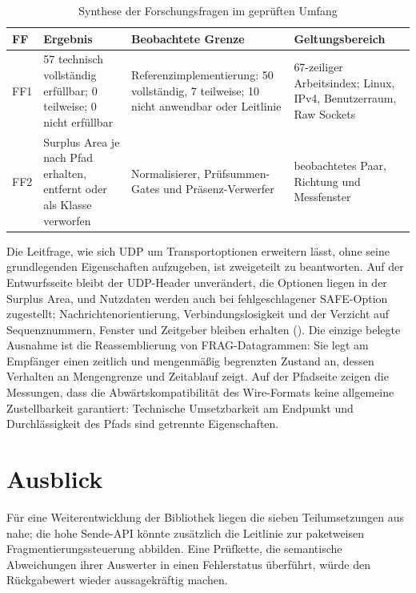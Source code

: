 \begin{table}[htbp]
    \centering
    \caption{Synthese der Forschungsfragen im geprüften Umfang}
    \label{tab:fazit-synthese}
    \small
    \begin{tabularx}{\textwidth}{@{}L{1.0cm}L{4.1cm}YL{4.2cm}@{}}
        \toprule
        \textbf{FF} & \textbf{Ergebnis} & \textbf{Beobachtete Grenze} & \textbf{Geltungsbereich} \\
        \midrule
        FF1 & 57 technisch vollständig erfüllbar; 0 teilweise; 0 nicht erfüllbar
        & Referenzimplementierung: 50 vollständig, 7 teilweise; 10 nicht anwendbar oder Leitlinie
        & 67-zeiliger Arbeitsindex; Linux, IPv4, Benutzerraum, Raw Sockets \\
        FF2 & Surplus Area je nach Pfad erhalten, entfernt oder als Klasse verworfen
        & Normalisierer, Prüfsummen-Gates und Präsenz-Verwerfer
        & beobachtetes Paar, Richtung und Messfenster \\
        \bottomrule
    \end{tabularx}
\end{table}

Die Leitfrage, wie sich UDP um Transportoptionen erweitern lässt, ohne seine grundlegenden Eigenschaften
aufzugeben, ist zweigeteilt zu beantworten. Auf der Entwurfsseite bleibt der UDP-Header
unverändert, die Optionen liegen in der Surplus Area, und Nutzdaten werden auch bei fehlgeschlagener
SAFE-Option zugestellt; Nachrichtenorientierung, Verbindungslosigkeit und der Verzicht
auf Sequenznummern, Fenster und Zeitgeber bleiben erhalten (). Die
einzige belegte Ausnahme ist die Reassemblierung von FRAG-Datagrammen: Sie legt am Empfänger einen
zeitlich und mengenmäßig begrenzten Zustand an, dessen Verhalten an Mengen\-grenze und Zeitablauf
 zeigt. Auf der Pfadseite zeigen die
Messungen, dass die Abwärtskompatibilität des Wire-Formats keine allgemeine Zustellbarkeit garantiert:
Technische Umsetzbarkeit am Endpunkt und Durchlässigkeit des Pfads sind getrennte Eigenschaften.

\section{Ausblick}
\label{sec:ausblick}

Für eine Weiterentwicklung der Bibliothek liegen die sieben Teilumsetzungen aus 
nahe; die hohe Sende-API könnte zusätzlich die Leitlinie zur paketweisen Fragmentierungssteuerung
abbilden. Eine Prüfkette, die semantische Abweichungen ihrer Auswerter in einen Fehlerstatus überführt,
würde den Rückgabewert wieder aussagekräftig machen.

